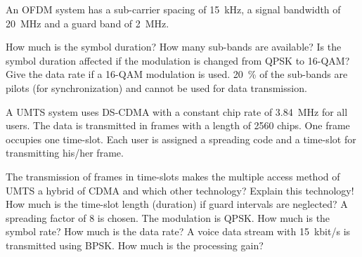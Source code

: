 \begin{solution}
	\begin{tasks}
	\end{tasks}
\end{solution}

\begin{question}[subtitle={OFDM}]
	An OFDM system has a sub-carrier spacing of \SI{15}{kHz}, a signal bandwidth of \SI{20}{MHz} and a guard band of \SI{2}{MHz}.
	
	\begin{tasks}
		\task
		How much is the symbol duration?
		\task
		How many sub-bands are available?
		\task
		Is the symbol duration affected if the modulation is changed from QPSK to 16-QAM?
		\task
		Give the data rate if a 16-QAM modulation is used. \SI{20}{\percent} of the sub-bands are pilots (for synchronization) and cannot be used for data transmission.
	\end{tasks}
\end{question}

\begin{solution}
	\begin{tasks}
	\end{tasks}
\end{solution}

\begin{question}[subtitle={3G cell phone -- UMTS}]
	A UMTS system uses DS-CDMA with a constant chip rate of \SI{3.84}{MHz} for all users. The data is transmitted in frames with a length of 2560 chips. One frame occupies one time-slot. Each user is assigned a spreading code and a time-slot for transmitting his/her frame.
	
	\begin{tasks}
		\task
		The transmission of frames in time-slots makes the multiple access method of UMTS a hybrid of CDMA and which other technology? Explain this technology!
		\task
		How much is the time-slot length (duration) if guard intervals are neglected?
		\task
		A spreading factor of 8 is chosen. The modulation is QPSK. How much is the symbol rate? How much is the data rate?
		\task
		A voice data stream with \SI{15}{kbit/s} is transmitted using BPSK. How much is the processing gain?
	\end{tasks}
\end{question}

\begin{solution}
	\begin{tasks}
	\end{tasks}
\end{solution}

%
